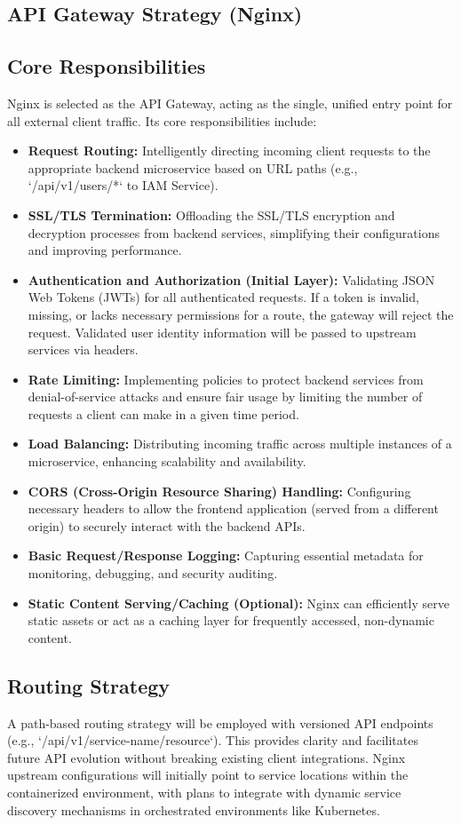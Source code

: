 \documentclass[12pt, a4paper]{report} %
\begin{document}
\begin{itemize}
\section{API Gateway Strategy (Nginx)}
  \subsection{Core Responsibilities}
    Nginx is selected as the API Gateway, acting as the single, unified entry point for all external client traffic. Its core responsibilities include:
    \begin{itemize}
        \item \textbf{Request Routing:} Intelligently directing incoming client requests to the appropriate backend microservice based on URL paths (e.g., `/api/v1/users/*` to IAM Service).
        \item \textbf{SSL/TLS Termination:} Offloading the SSL/TLS encryption and decryption processes from backend services, simplifying their configurations and improving performance.
        \item \textbf{Authentication and Authorization (Initial Layer):} Validating JSON Web Tokens (JWTs) for all authenticated requests. If a token is invalid, missing, or lacks necessary permissions for a route, the gateway will reject the request. Validated user identity information will be passed to upstream services via headers.
        \item \textbf{Rate Limiting:} Implementing policies to protect backend services from denial-of-service attacks and ensure fair usage by limiting the number of requests a client can make in a given time period.
        \item \textbf{Load Balancing:} Distributing incoming traffic across multiple instances of a microservice, enhancing scalability and availability.
        \item \textbf{CORS (Cross-Origin Resource Sharing) Handling:} Configuring necessary headers to allow the frontend application (served from a different origin) to securely interact with the backend APIs.
        \item \textbf{Basic Request/Response Logging:} Capturing essential metadata for monitoring, debugging, and security auditing.
        \item \textbf{Static Content Serving/Caching (Optional):} Nginx can efficiently serve static assets or act as a caching layer for frequently accessed, non-dynamic content.
    \end{itemize}
  \subsection{Routing Strategy}
    A path-based routing strategy will be employed with versioned API endpoints (e.g., `/api/v1/service-name/resource`). This provides clarity and facilitates future API evolution without breaking existing client integrations. Nginx upstream configurations will initially point to service locations within the containerized environment, with plans to integrate with dynamic service discovery mechanisms in orchestrated environments like Kubernetes.

\end{itemize}
\end{document}
